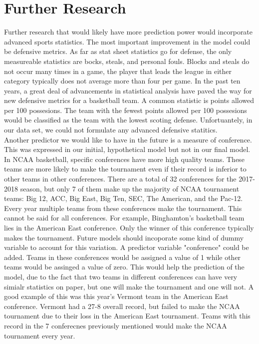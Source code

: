 \documentclass[]{scrartcl}
\begin{document}
\section*{Further Research}
Further research that would likely have more prediction power would incorporate advanced sports statistics. The most important improvement in the model could be defensive metrics. As far as stat sheet statistics go for defense, the only measureable statistics are bocks, steals, and personal fouls. Blocks and steals do not occur many times in a game, the  player that leads the league in either category typically does not average more than four per game. In the past ten years, a great deal of advancements in statistical analysis have paved the way for new defensive metrics for a basketball team. A common statistic is points allowed per 100 possesions. The team with the fewest points allowed per 100 possesions would be classified as the team with the lowest scoting defense. Unfortuantely, in our data set, we could not formulate any advanced defensive statitics.\\
Another predictor we would like to have in the future is a measure of conference. This was expressed in our initial, hypothetical model but not in our final model. In NCAA basketball, specific conferences have more high quality teams. These teams are more likely to make the tournament even if their record is inferior to other teams in other conferences. There are a total of 32 conferences for the 2017-2018 season, but only 7 of them make up the majority of NCAA tournament teams: Big 12, ACC, Big East, Big Ten, SEC, The American, and the Pac-12. Every  year multiple teams from these conferences make the tournament. This cannot be said for all conferences. For example, Binghamton's basketball team lies in the American East conference. Only the winner of this conference typically makes the tournament. Future models should incoporate some kind of dummy variable to account for this variation. A predictor variable "conference" could be added. Teams in these conferences would be assigned a value of 1 while other teams would be assinged a value of zero. This would help the prediction of the model, due to the fact that two teams in different conferences can have very simialr statistics on paper, but one will make the tournament and one will not. A good example of this was this year's Vermont team in the American East conference. Vermont had a 27-8 overall record, but failed to make the NCAA tournament due to their loss in the American East tournament. Teams with this record in the 7 conferecnes previously mentioned would make the NCAA tournament every year.  
\end{document}
